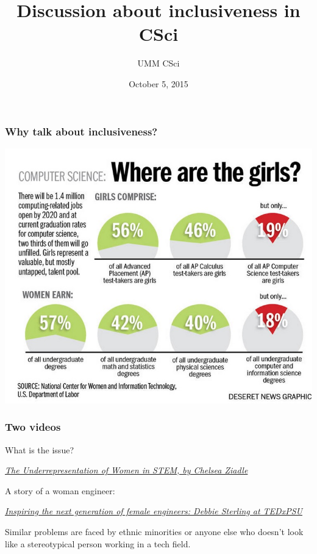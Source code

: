 \documentclass{beamer}
\begin{document}
\title{Discussion about inclusiveness in CSci}
\author{UMM CSci}
\date{October 5, 2015}

\begin{frame}
\maketitle
\end{frame}

\begin{frame}
\frametitle{Why talk about inclusiveness?}
\includegraphics[scale=0.5]{Stats.jpg}
\end{frame}

\begin{frame}
\frametitle{Two videos}
What is the issue? 

{\it 
\href{https://www.youtube.com/watch?v=fQyCBTDproE}{The Underrepresentation of Women in STEM, by Chelsea Ziadle}}

A story of a woman engineer:

{\it
\href{https://www.youtube.com/watch?v=FEeTLopLkEo}{Inspiring the next generation of female engineers: Debbie Sterling at TEDxPSU}}

Similar problems are faced by ethnic minorities or anyone else who doesn't look like a stereotypical  person working in a tech field. 
\end{frame}
\end{document}
